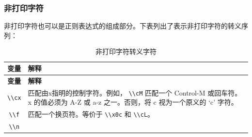 \documentclass[doctor,openright,twoside]{sjtuthesis}
\newcommand{\passthrough}[1]{#1}
\theoremstyle{plain}
\theoremstyle{definition}
\theoremstyle{remark}
\theoremstyle{ocrenumbox}
\theoremstyle{plain}
\begin{document}
\hypertarget{section-86}{%
\subsubsection{非打印字符}\label{section-86}}

非打印字符也可以是正则表达式的组成部分。下表列出了表示非打印字符的转义序列：

\begin{longtable}[]{@{}cl@{}}
\caption{非打印字符转义字符}\tabularnewline
\toprule
\begin{minipage}[b]{0.23\columnwidth}\centering
\textbf{变量}\strut
\end{minipage} & \begin{minipage}[b]{0.72\columnwidth}\raggedright
\textbf{解释}\strut
\end{minipage}\tabularnewline
\midrule
\endfirsthead
\toprule
\begin{minipage}[b]{0.23\columnwidth}\centering
\textbf{变量}\strut
\end{minipage} & \begin{minipage}[b]{0.72\columnwidth}\raggedright
\textbf{解释}\strut
\end{minipage}\tabularnewline
\midrule
\endhead
\begin{minipage}[t]{0.23\columnwidth}\centering
\passthrough{\lstinline!\\cx!}\strut
\end{minipage} & \begin{minipage}[t]{0.72\columnwidth}\raggedright
匹配由x指明的控制字符。例如， \passthrough{\lstinline!\\cM!} 匹配一个 Control-M 或回车符。x 的值必须为 A-Z 或 a-z 之一。否则，将 c 视为一个原义的 `c' 字符。\strut
\end{minipage}\tabularnewline
\begin{minipage}[t]{0.23\columnwidth}\centering
\passthrough{\lstinline!\\f!}\strut
\end{minipage} & \begin{minipage}[t]{0.72\columnwidth}\raggedright
匹配一个换页符。等价于 \passthrough{\lstinline!\\x0c!} 和 \passthrough{\lstinline!\\cL!}。\strut
\end{minipage}\tabularnewline
\begin{minipage}[t]{0.23\columnwidth}\centering
\passthrough{\lstinline!\\n!}\strut
\end{minipage} & \begin{minipage}[t]{0.72\columnwidth}\raggedright

\end{minipage}
\end{longtable}
\end{document}
